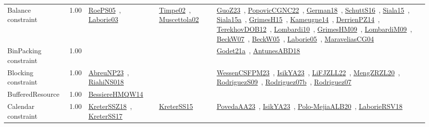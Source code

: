 {\begin{longtable}{p{3cm}r>{\raggedright\arraybackslash}p{6cm}>{\raggedright\arraybackslash}p{6cm}>{\raggedright\arraybackslash}p{8cm}}
\index{Balance constraint}\index{Constraints!Balance constraint}Balance constraint &  1.00 & \href{../works/RoePS05.pdf}{RoePS05}~\cite{RoePS05}, \href{../works/Laborie03.pdf}{Laborie03}~\cite{Laborie03} & \href{../works/Timpe02.pdf}{Timpe02}~\cite{Timpe02}, \href{../works/Muscettola02.pdf}{Muscettola02}~\cite{Muscettola02} & \href{../works/GuoZ23.pdf}{GuoZ23}~\cite{GuoZ23}, \href{../works/PopovicCGNC22.pdf}{PopovicCGNC22}~\cite{PopovicCGNC22}, \href{../works/German18.pdf}{German18}~\cite{German18}, \href{../works/SchuttS16.pdf}{SchuttS16}~\cite{SchuttS16}, \href{../works/Siala15.pdf}{Siala15}~\cite{Siala15}, \href{../works/Siala15a.pdf}{Siala15a}~\cite{Siala15a}, \href{../works/GrimesH15.pdf}{GrimesH15}~\cite{GrimesH15}, \href{../works/Kameugne14.pdf}{Kameugne14}~\cite{Kameugne14}, \href{../works/DerrienPZ14.pdf}{DerrienPZ14}~\cite{DerrienPZ14}, \href{../works/TerekhovDOB12.pdf}{TerekhovDOB12}~\cite{TerekhovDOB12}, \href{../works/Lombardi10.pdf}{Lombardi10}~\cite{Lombardi10}, \href{../works/GrimesHM09.pdf}{GrimesHM09}~\cite{GrimesHM09}, \href{../works/LombardiM09.pdf}{LombardiM09}~\cite{LombardiM09}, \href{../works/BeckW07.pdf}{BeckW07}~\cite{BeckW07}, \href{../works/BeckW05.pdf}{BeckW05}~\cite{BeckW05}, \href{../works/Laborie05.pdf}{Laborie05}~\cite{Laborie05}, \href{../works/MaraveliasCG04.pdf}{MaraveliasCG04}~\cite{MaraveliasCG04}\\
\index{BinPacking constraint}\index{Constraints!BinPacking constraint}BinPacking constraint &  1.00 &  &  & \href{../works/Godet21a.pdf}{Godet21a}~\cite{Godet21a}, \href{../works/AntunesABD18.pdf}{AntunesABD18}~\cite{AntunesABD18}\\
\index{Blocking constraint}\index{Constraints!Blocking constraint}Blocking constraint &  1.00 & \href{../works/AbreuNP23.pdf}{AbreuNP23}~\cite{AbreuNP23}, \href{../works/RiahiNS018.pdf}{RiahiNS018}~\cite{RiahiNS018} &  & \href{../works/WessenCSFPM23.pdf}{WessenCSFPM23}~\cite{WessenCSFPM23}, \href{../works/IsikYA23.pdf}{IsikYA23}~\cite{IsikYA23}, \href{../works/LiFJZLL22.pdf}{LiFJZLL22}~\cite{LiFJZLL22}, \href{../works/MengZRZL20.pdf}{MengZRZL20}~\cite{MengZRZL20}, \href{../works/RodriguezS09.pdf}{RodriguezS09}~\cite{RodriguezS09}, \href{../works/Rodriguez07b.pdf}{Rodriguez07b}~\cite{Rodriguez07b}, \href{../works/Rodriguez07.pdf}{Rodriguez07}~\cite{Rodriguez07}\\
\index{BufferedResource}\index{Constraints!BufferedResource}BufferedResource &  1.00 & \href{../works/BessiereHMQW14.pdf}{BessiereHMQW14}~\cite{BessiereHMQW14} &  & \\
\index{Calendar constraint}\index{Constraints!Calendar constraint}Calendar constraint &  1.00 & \href{../works/KreterSSZ18.pdf}{KreterSSZ18}~\cite{KreterSSZ18}, \href{../works/KreterSS17.pdf}{KreterSS17}~\cite{KreterSS17} & \href{../works/KreterSS15.pdf}{KreterSS15}~\cite{KreterSS15} & \href{../works/PovedaAA23.pdf}{PovedaAA23}~\cite{PovedaAA23}, \href{../works/IsikYA23.pdf}{IsikYA23}~\cite{IsikYA23}, \href{../works/Polo-MejiaALB20.pdf}{Polo-MejiaALB20}~\cite{Polo-MejiaALB20}, \href{../works/LaborieRSV18.pdf}{LaborieRSV18}~\cite{LaborieRSV18}\\

\end{longtable}}
